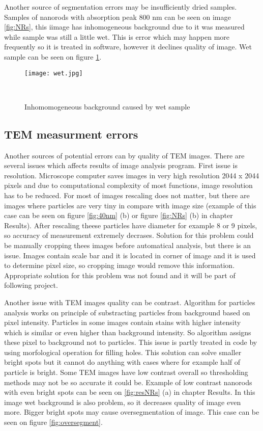 Another source of segmentation errors may be insufficiently dried samples. Samples of nanorods with absorption peak 800 nm can be seen on image \ref{fig:NRs}, this iimage has inhomogeneous background due to it was measured while sample was still a little wet. This is error which may happen more frequently so it is treated in software, however it declines quality of image. Wet sample can be seen on figure \ref{fig:wet}.

\begin{figure}[h!]
\begin{center}
    \texttt{[image: wet.jpg]}
    \caption{Inhomomogeneous background caused by wet sample}~\label{fig:wet}
\end{center}
\end{figure}

\subsection{TEM measurment errors}\label{image_errors}

Another sources of potential errors can by quality of TEM images. There are several issues which affects results of image analysis program. First issue is resolution. Microscope computer saves images in very high resolution 2044 x 2044 pixels and due to computational complexity of most functions, image resolution has to be reduced. For most of images rescaling does not matter, but there are images where particles are very tiny in compare with image size (example of this case can be seen on figure \ref{fig:40nm} (b) or figure \ref{fig:NRs} (b) in chapter Results). After rescaling theese particles have diameter for example 8 or 9 pixels, so accuracy of measurement extremely decrases. Solution for this problem could be manually cropping thees images before automatical analysis, but there is an issue. Images contain scale bar and it is located in corner of image and it is used to determine pixel size, so cropping image would remove this information. Appropriate solution for this problem was not found and it will be part of following project.

Another issue with TEM images quality can be contrast. Algorithm for particles analysis works on principle of substracting particles from background based on pixel intensity. Particles in some images contain stains with higher intensity which is similar or even higher than background intensity. So algorithm assigns these pixel to background not to particles. This issue is partly treated in code by using morfological operation for filling holes. This solution can solve smaller bright spots but it cannot do anything with cases where for example half of particle is bright. Some TEM images have low contrast overall so thresholding methods may not be so accurate it could be. Example of low contrast nanorods with even bright spots can be seen on \ref{fig:resNRs} (a) in chapter Results. In this image wet background is also problem, so it decreases quality of image even more. Bigger bright spots may cause oversegmentation of image. This case can be seen on figure \ref{fig:oversegment}.

